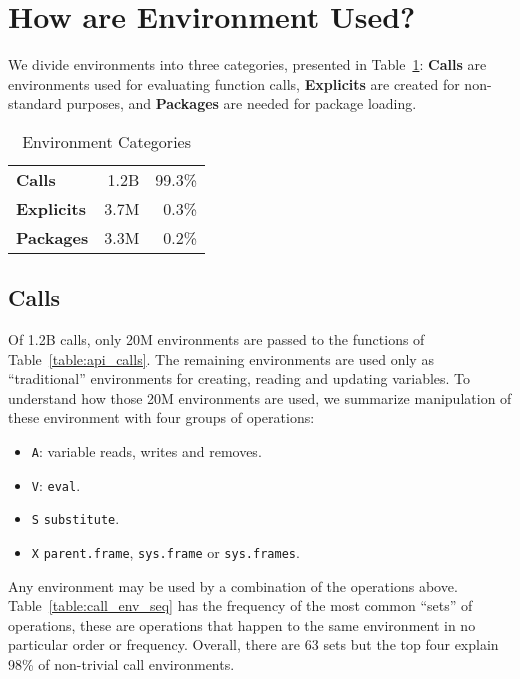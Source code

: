 \documentclass[10pt,review,sigplan,authorversion=true]{acmart}
\newcommand{\code}[1]{\lstinline |#1|\xspace}
\newcommand{\eval}{\code{eval}}
\newcommand{\substitute}{\code{substitute}}
\begin{document}
\section{How are Environment Used?}

We divide environments into three categories, presented in
Table~\ref{table:env_category}: \textbf{Calls} are environments used for
evaluating function calls, \textbf{Explicits} are created for non-standard
purposes, and \textbf{Packages} are needed for package loading.

\begin{table}[!h] \small
  \caption{Environment Categories} \label{table:env_category}\centering
  \begin{tabular}{lrr}\toprule
     \textbf{Calls}&     1.2B& 99.3\%\\
    \textbf{Explicits}& 3.7M& 0.3\%\\
    \textbf{Packages}&  3.3M& 0.2\%\\\bottomrule
  \end{tabular}
\end{table}


\subsection{Calls}

Of 1.2B calls, only 20M environments are passed to the functions of
Table~\ref{table:api_calls}. The remaining environments are used only as
``traditional'' environments for creating, reading and updating variables. To
understand how those 20M environments are used, we summarize manipulation
of these environment with four groups of operations:

\begin{itemize}
\item \texttt{A}: variable reads, writes and removes.
\item \texttt{V}: \eval.
\item \texttt{S}  \substitute.
\item \texttt{X}  \code{parent.frame}, \code{sys.frame} or \code{sys.frames}.
\end{itemize}

\noindent
Any environment may be used by a combination of the operations above.
Table~\ref{table:call_env_seq} has the frequency of the most common ``sets'' of
operations, these are operations that happen to the same environment in no
particular order or frequency. Overall, there are 63 sets but the top four
explain 98\% of non-trivial call environments.
\end{document}
